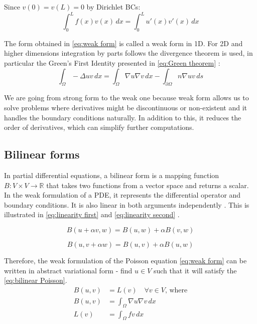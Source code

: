 \documentclass[acmsmall,screen]{MapleTrans}
\begin{document}
Since $v(0) = v(L) = 0$ by Dirichlet BCs:
\begin{equation}
    \int_{0}^{L}f(x) v(x) \, dx = \int_{0}^{L}u'(x) v'(x) \, dx
    \label{eq:weak form}
\end{equation}

The form obtained in \eqref{eq:weak form} is called a weak form in 1D. For 2D and higher dimensions integration by parts follows the divergence theorem is used, in particular the Green's First Identity presented in \eqref{eq:Green theorem} \cite{b10}:
\begin{equation}
    \int_{\Omega}-\Delta{u}v \, dx = \int_{\Omega}\nabla{u}\nabla{v} \, dx - \int_{\partial{\Omega}} n \nabla{u}v \, ds
    \label{eq:Green theorem}
\end{equation}

We are going from strong form to the weak one because weak form allows us to solve problems where derivatives might be discontinuous or non-existent and it handles the boundary conditions naturally. In addition to this, it reduces the order of derivatives, which can simplify further computations.


\subsection{Bilinear forms}
In partial differential equations, a bilinear form is a mapping function $B: V \times V \rightarrow \mathbb{R}$ that takes two functions from a vector space and returns a scalar. 
In the weak formulation of a PDE, it represents the differential operator and boundary conditions. It is also linear in both arguments independently \cite{b6}. This is illustrated in \eqref{eq:linearity first} and \eqref{eq:linearity second} \cite{b6.1}.

\begin{equation}
    B(u + \alpha v, w) = B(u, w) + \alpha B(v, w) 
    \label{eq:linearity first}
\end{equation}

\begin{equation}
    B(u, v + \alpha w) = B(u, v) + \alpha B(u, w)
    \label{eq:linearity second}
\end{equation}

Therefore, the weak formulation of the Poisson equation \eqref{eq:weak form} can be written in abstract variational form - find $u \in V$ such that it will satisfy the \eqref{eq:bilinear Poisson}.
\begin{equation}
\begin{aligned}
    B(u, v) &= L(v) \quad \forall v \in V \text{, where} \\
    B(u, v) &= \int_{\Omega}\nabla{u}\nabla{v} \, dx \\
    L(v) &= \int_{\Omega}fv \, dx
    \label{eq:bilinear Poisson}
\end{aligned}
\end{equation}
\end{document}
